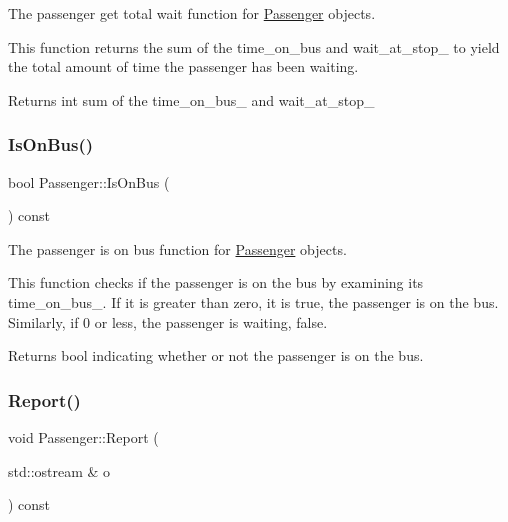 The passenger get total wait function for \hyperlink{classPassenger}{Passenger} objects. 

This function returns the sum of the time\+\_\+on\+\_\+bus and wait\+\_\+at\+\_\+stop\+\_\+ to yield the total amount of time the passenger has been waiting.

\begin{DoxyReturn}{Returns}
int sum of the time\+\_\+on\+\_\+bus\+\_\+ and wait\+\_\+at\+\_\+stop\+\_\+ 
\end{DoxyReturn}
\mbox{\label{classPassenger_a2acf008ec444afcc859b914ee24add0e}} 
\subsubsection{\texorpdfstring{Is\+On\+Bus()}{IsOnBus()}}
{\footnotesize\ttfamily bool Passenger\+::\+Is\+On\+Bus (\begin{DoxyParamCaption}{ }\end{DoxyParamCaption}) const}



The passenger is on bus function for \hyperlink{classPassenger}{Passenger} objects. 

This function checks if the passenger is on the bus by examining its time\+\_\+on\+\_\+bus\+\_\+. If it is greater than zero, it is true, the passenger is on the bus. Similarly, if 0 or less, the passenger is waiting, false.

\begin{DoxyReturn}{Returns}
bool indicating whether or not the passenger is on the bus. 
\end{DoxyReturn}
\mbox{\label{classPassenger_aee3f9d7f6f2a848034971559faf65248}} 
\subsubsection{\texorpdfstring{Report()}{Report()}}
{\footnotesize\ttfamily void Passenger\+::\+Report (\begin{DoxyParamCaption}\item[{std\+::ostream \&}]{o }\end{DoxyParamCaption}) const}




